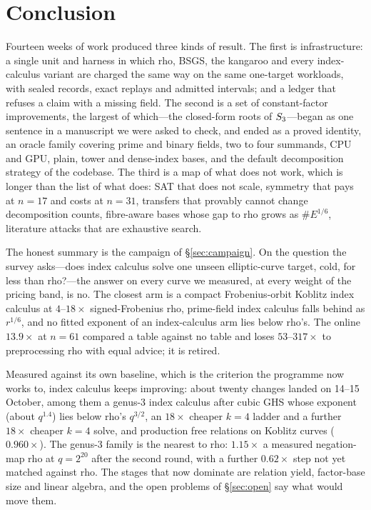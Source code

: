 \section{Conclusion}\label{sec:conclusion}

Fourteen weeks of work produced three kinds of result. The first is
infrastructure: a single unit and harness in which rho, BSGS, the kangaroo
and every index-calculus variant are charged the same way on the same
one-target workloads, with sealed records, exact replays and admitted
intervals; and a ledger that refuses a claim with a missing field. The
second is a set of constant-factor improvements, the largest of which---the
closed-form roots of $S_{3}$---began as one sentence in a manuscript we were
asked to check, and ended as a proved identity, an oracle family covering
prime and binary fields, two to four summands, CPU and GPU, plain, tower
and dense-index bases, and the default decomposition strategy of the
codebase. The third is a map of what does not work, which is longer than
the list of what does: SAT that does not scale, symmetry that pays at
$n=17$ and costs at $n=31$, transfers that provably cannot change
decomposition counts, fibre-aware bases whose gap to rho grows as
$\#E^{1/6}$, literature attacks that are exhaustive search.

The honest summary is the campaign of \S\ref{sec:campaign}. On the
question the survey asks---does index calculus solve one unseen
elliptic-curve target, cold, for less than rho?---the answer on every curve
we measured, at every weight of the pricing band, is no. The closest arm is
a compact Frobenius-orbit Koblitz index calculus at $4$--$18\times$
signed-Frobenius rho, prime-field index calculus falls behind as $r^{1/6}$,
and no fitted exponent of an index-calculus arm lies below rho's. The
online $13.9\times$ at $n=61$ compared a table against no table and loses
$53$--$317\times$ to preprocessing rho with equal advice; it is retired.

Measured against its own baseline, which is the criterion the programme now
works to, index calculus keeps improving: about twenty changes landed on
14--15 October, among them a genus-3 index calculus after cubic GHS
whose exponent (about $q^{1.4}$) lies below rho's $q^{3/2}$, an $18\times$ cheaper
$k=4$ ladder and a further $18\times$ cheaper $k=4$ solve, and production
free relations on Koblitz curves ($0.960\times$). The genus-3 family is
the nearest to rho: $1.15\times$ a measured negation-map rho at $q=2^{20}$
after the second round, with a further $0.62\times$ step not yet matched
against rho. The stages that now
dominate are relation yield, factor-base size and linear algebra, and the
open problems of \S\ref{sec:open} say what would move them.
